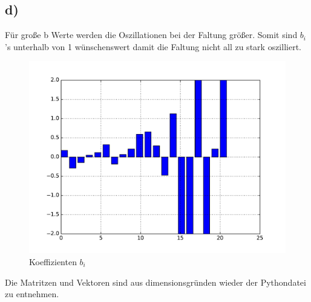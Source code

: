 \subsection*{d)}
Für große b Werte werden die Oszillationen bei der Faltung größer. Somit sind $b_i$'s unterhalb von 1 wünschenswert damit die Faltung nicht all zu stark oszilliert. 
\begin{figure}[H]
  \centering
  \includegraphics[width=\textwidth]{./Python/bar.pdf}
  \caption{Koeffizienten $b_i$}
\end{figure}
Die Matritzen und Vektoren sind aus dimensionsgründen wieder der Pythondatei zu entnehmen.
